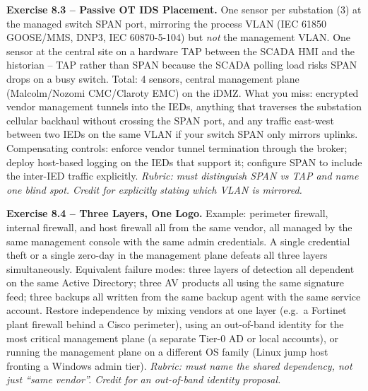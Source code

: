 \documentclass[11pt,a4paper]{article}
\begin{document}
\begin{solutionbox}
\textbf{Exercise 8.3 -- Passive OT IDS Placement.}
One sensor per substation (3) at the managed switch SPAN port, mirroring the process VLAN (IEC 61850 GOOSE/MMS, DNP3, IEC 60870-5-104) but \emph{not} the management VLAN. One sensor at the central site on a hardware TAP between the SCADA HMI and the historian -- TAP rather than SPAN because the SCADA polling load risks SPAN drops on a busy switch. Total: 4 sensors, central management plane (Malcolm/Nozomi CMC/Claroty EMC) on the iDMZ. What you miss: encrypted vendor management tunnels into the IEDs, anything that traverses the substation cellular backhaul without crossing the SPAN port, and any traffic east-west between two IEDs on the same VLAN if your switch SPAN only mirrors uplinks. Compensating controls: enforce vendor tunnel termination through the broker; deploy host-based logging on the IEDs that support it; configure SPAN to include the inter-IED traffic explicitly.
\textit{Rubric: must distinguish SPAN vs TAP and name one blind spot. Credit for explicitly stating which VLAN is mirrored.}
\end{solutionbox}

\begin{solutionbox}
\textbf{Exercise 8.4 -- Three Layers, One Logo.}
Example: perimeter firewall, internal firewall, and host firewall all from the same vendor, all managed by the same management console with the same admin credentials. A single credential theft or a single zero-day in the management plane defeats all three layers simultaneously. Equivalent failure modes: three layers of detection all dependent on the same Active Directory; three AV products all using the same signature feed; three backups all written from the same backup agent with the same service account. Restore independence by mixing vendors at one layer (e.g.\ a Fortinet plant firewall behind a Cisco perimeter), using an out-of-band identity for the most critical management plane (a separate Tier-0 AD or local accounts), or running the management plane on a different OS family (Linux jump host fronting a Windows admin tier).
\textit{Rubric: must name the shared dependency, not just ``same vendor''. Credit for an out-of-band identity proposal.}
\end{solutionbox}
\end{document}
